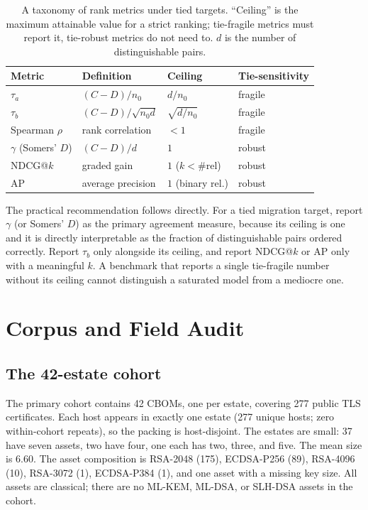 \documentclass[conference,10pt]{IEEEtran}
\newcommand{\tb}{\tau_b}
\newcommand{\distinct}{d}
\newcommand{\nzero}{n_0}
\begin{document}
\begin{table}[t]
\centering
\caption{A taxonomy of rank metrics under tied targets. ``Ceiling'' is the maximum attainable
value for a strict ranking; tie-fragile metrics must report it, tie-robust metrics do not need
to. $\distinct$ is the number of distinguishable pairs.}
\label{tab:taxonomy}
\footnotesize
\begin{tabular}{@{}>{\raggedright\arraybackslash}p{1.4cm}>{\raggedright\arraybackslash}p{2.45cm}>{\raggedright\arraybackslash}p{2.2cm}>{\raggedright\arraybackslash}p{1.4cm}@{}}
\toprule
Metric & Definition & Ceiling & Tie-sensitivity \\
\midrule
$\tau_a$ & $(C-D)/\nzero$ & $\distinct/\nzero$ & fragile \\
$\tb$ & $(C-D)/\sqrt{\nzero\distinct}$ & $\sqrt{\distinct/\nzero}$ & fragile \\
Spearman $\rho$ & rank correlation & $<1$ & fragile \\
$\gamma$ (Somers' $D$) & $(C-D)/\distinct$ & $1$ & robust \\
NDCG@$k$ & graded gain & $1$ ($k<\#\text{rel}$) & robust \\
AP & average precision & $1$ (binary rel.) & robust \\
\bottomrule
\end{tabular}
\end{table}

The practical recommendation follows directly. For a tied migration target, report $\gamma$ (or
Somers' $D$) as the primary agreement measure, because its ceiling is one and it is directly
interpretable as the fraction of distinguishable pairs ordered correctly. Report $\tb$ only
alongside its ceiling, and report NDCG@$k$ or AP only with a meaningful $k$. A benchmark that
reports a single tie-fragile number without its ceiling cannot distinguish a saturated model
from a mediocre one.

\section{Corpus and Field Audit}
\label{sec:corpus}

\subsection{The 42-estate cohort}
The primary cohort contains 42 CBOMs, one per estate, covering 277 public TLS certificates.
Each host appears in exactly one estate (277 unique hosts; zero within-cohort repeats), so the
packing is host-disjoint. The estates are small: 37 have seven assets, two have four, one each
has two, three, and five. The mean size is 6.60. The asset composition is RSA-2048 (175),
ECDSA-P256 (89), RSA-4096 (10), RSA-3072 (1), ECDSA-P384 (1), and one asset with a missing key
size. All assets are classical; there are no ML-KEM, ML-DSA, or SLH-DSA assets in the cohort.
\end{document}
